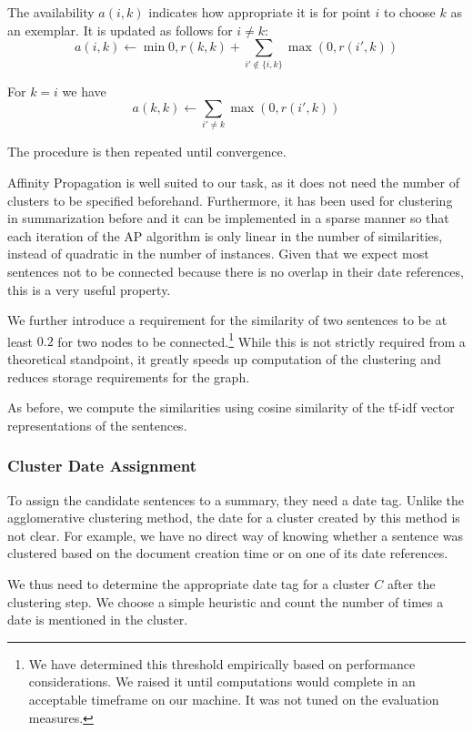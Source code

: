 \documentclass[a4paper,BCOR=10mm]{report}
\numberwithin{lemma}{chapter}
\numberwithin{definition}{chapter}
\begin{document}
The availability $a(i, k)$ indicates how appropriate it is for point $i$ to choose $k$ as an exemplar.
It is updated as follows for $i \neq k$:
\begin{equation}
a(i, k) \leftarrow \min 0, r(k, k) + \sum_{i' \not\in \{i, k\}} \max(0, r(i', k))
\end{equation}

For $k = i$ we have
\begin{equation}
a(k, k) \leftarrow \sum_{i' \neq k} \max(0, r(i', k))
\end{equation}

The procedure is then repeated until convergence.

Affinity Propagation is well suited to our task, as it does not need the number of clusters to be specified beforehand. Furthermore, it has been used for clustering in summarization before \citep{salient-updates} and it can be implemented in a sparse manner so that each iteration of the AP algorithm is only linear in the number of similarities, instead of quadratic in the number of instances. Given that we expect most sentences not to be connected because there is no overlap in their date references, this is a very useful property.

We further introduce a requirement for the similarity of two sentences to be at least $0.2$ for two nodes to be connected.\footnote{We have determined this threshold empirically based on performance considerations. We raised it until computations would complete in an acceptable timeframe on our machine. It was not tuned on the evaluation measures.} While this is not strictly required from a theoretical standpoint, it greatly speeds up computation of the clustering and reduces storage requirements for the graph.

As before, we compute the similarities using cosine similarity of the tf-idf vector representations of the sentences.

\subsubsection{Cluster Date Assignment}

To assign the candidate sentences to a summary, they need a date tag. Unlike the agglomerative clustering method, the date for a cluster created by this method is not clear. For example, we have no direct way of knowing whether a sentence was clustered based on the document creation time or on one of its date references.

We thus need to determine the appropriate date tag for a cluster $C$ after the clustering step. We choose a simple heuristic and count the number of times a date is mentioned in the cluster.
\end{document}
